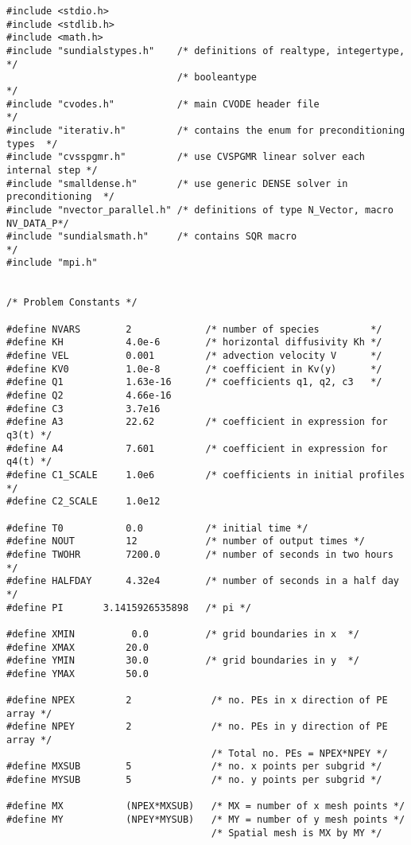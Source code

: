 \begin{verbatim}
#include <stdio.h>
#include <stdlib.h>
#include <math.h>
#include "sundialstypes.h"    /* definitions of realtype, integertype,        */
                              /* booleantype                                  */
#include "cvodes.h"           /* main CVODE header file                       */
#include "iterativ.h"         /* contains the enum for preconditioning types  */
#include "cvsspgmr.h"         /* use CVSPGMR linear solver each internal step */
#include "smalldense.h"       /* use generic DENSE solver in preconditioning  */
#include "nvector_parallel.h" /* definitions of type N_Vector, macro NV_DATA_P*/
#include "sundialsmath.h"     /* contains SQR macro                           */
#include "mpi.h"


/* Problem Constants */

#define NVARS        2             /* number of species         */
#define KH           4.0e-6        /* horizontal diffusivity Kh */
#define VEL          0.001         /* advection velocity V      */
#define KV0          1.0e-8        /* coefficient in Kv(y)      */
#define Q1           1.63e-16      /* coefficients q1, q2, c3   */ 
#define Q2           4.66e-16
#define C3           3.7e16
#define A3           22.62         /* coefficient in expression for q3(t) */
#define A4           7.601         /* coefficient in expression for q4(t) */
#define C1_SCALE     1.0e6         /* coefficients in initial profiles    */
#define C2_SCALE     1.0e12

#define T0           0.0           /* initial time */
#define NOUT         12            /* number of output times */
#define TWOHR        7200.0        /* number of seconds in two hours  */
#define HALFDAY      4.32e4        /* number of seconds in a half day */
#define PI       3.1415926535898   /* pi */ 

#define XMIN          0.0          /* grid boundaries in x  */
#define XMAX         20.0           
#define YMIN         30.0          /* grid boundaries in y  */
#define YMAX         50.0

#define NPEX         2              /* no. PEs in x direction of PE array */
#define NPEY         2              /* no. PEs in y direction of PE array */
                                    /* Total no. PEs = NPEX*NPEY */
#define MXSUB        5              /* no. x points per subgrid */
#define MYSUB        5              /* no. y points per subgrid */

#define MX           (NPEX*MXSUB)   /* MX = number of x mesh points */
#define MY           (NPEY*MYSUB)   /* MY = number of y mesh points */
                                    /* Spatial mesh is MX by MY */


\end{verbatim}
